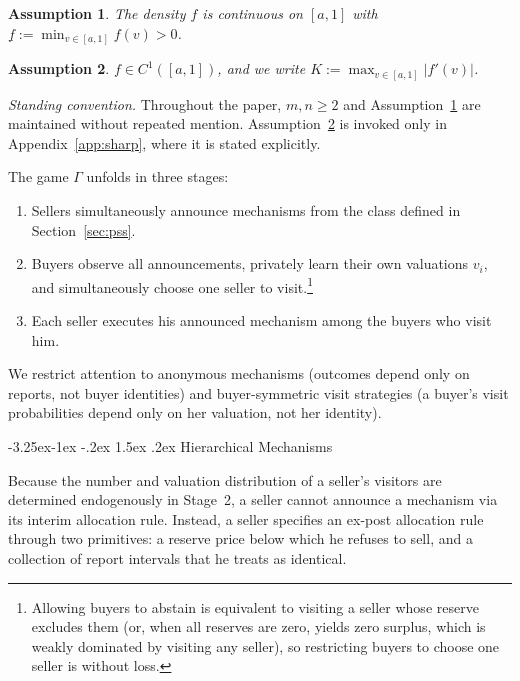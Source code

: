 \documentclass[12pt]{article}
\makeatletter
\theoremstyle{mystyle}
\theoremstyle{mystyle2}
\newtheorem{assumption}{Assumption}
\newcommand{\mmpfont}{\scshape}
\renewcommand\subsection{\@startsection{subsection}{2}{\z@}%
                                     {-3.25ex\@plus -1ex \@minus -.2ex}%
                                     {1.5ex \@plus .2ex}%
                                     {\normalfont\normalsize\mmpfont}}
\newcommand{\1}{\mathbf{1}}
\makeatother
\begin{document}
\begin{assumption}\label{a:one}
The density $f$ is continuous on $[a,1]$ with $\underline f:=\min_{v\in[a,1]} f(v)>0$.
\end{assumption}

\begin{assumption}\label{a:two}
$f\in C^1([a,1])$, and we write $K:=\max_{v\in[a,1]} |f'(v)|$.
\end{assumption}

\emph{Standing convention.} Throughout the paper, $m,n\ge 2$ and Assumption~\ref{a:one} are maintained without repeated mention. Assumption~\ref{a:two} is invoked only in Appendix~\ref{app:sharp}, where it is stated explicitly.

The game $\Gamma$ unfolds in three stages:
\begin{enumerate}
\item Sellers simultaneously announce mechanisms from the class defined in Section~\ref{sec:pss}.
\item Buyers observe all announcements, privately learn their own valuations $v_i$, and simultaneously choose one seller to visit.\footnote{Allowing buyers to abstain is equivalent to visiting a seller whose reserve excludes them (or, when all reserves are zero, yields zero surplus, which is weakly dominated by visiting any seller), so restricting buyers to choose one seller is without loss.}
\item Each seller executes his announced mechanism among the buyers who visit him.
\end{enumerate}

We restrict attention to anonymous mechanisms (outcomes depend only on reports, not buyer identities) and buyer-symmetric visit strategies (a buyer's visit probabilities depend only on her valuation, not her identity).

\subsection{Hierarchical Mechanisms} \label{sec:pss}

Because the number and valuation distribution of a seller's visitors are determined endogenously in Stage~2, a seller cannot announce a mechanism via its interim allocation rule. Instead, a seller specifies an ex-post allocation rule through two primitives: a reserve price below which he refuses to sell, and a collection of report intervals that he treats as identical.
\end{document}
